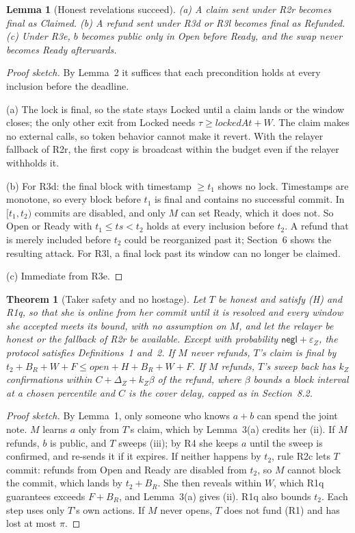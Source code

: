 \documentclass[10pt,letterpaper]{article}
\theoremstyle{plain}
\newtheorem{theorem}{Theorem}
\newtheorem{lemma}{Lemma}
\theoremstyle{definition}
\newcommand{\st}[1]{\textsf{#1}}
\begin{document}
\begin{lemma}[Honest revelations succeed]
(a) A claim sent under R2r becomes final as \st{Claimed}. (b) A refund sent under R3d or R3l
becomes final as \st{Refunded}. (c) Under R3e, $b$ becomes public only in \st{Open} before Ready,
and the swap never becomes \st{Ready} afterwards.
\end{lemma}
\begin{proof}[Proof sketch]
By Lemma~2 it suffices that each precondition holds at every inclusion before the deadline.

(a) The lock is final, so the state stays \st{Locked} until a claim lands or the window closes;
the only other exit from \st{Locked} needs $\tau \ge \mathit{lockedAt}+W$. The claim makes no
external calls, so token behavior cannot make it revert. With the relayer fallback of R2r, the
first copy is broadcast within the budget even if the relayer withholds it.

(b) For R3d: the final block with timestamp $\ge t_1$ shows no lock. Timestamps are monotone, so
every block before $t_1$ is final and contains no successful commit. In $[t_1, t_2)$ commits are
disabled, and only $M$ can set Ready, which it does not. So \st{Open} or \st{Ready} with
$t_1 \le ts < t_2$ holds at every inclusion before $t_2$. A refund that is merely included before
$t_2$ could be reorganized past it; Section~6 shows the resulting attack. For R3l, a final lock
past its window can no longer be claimed.

(c) Immediate from R3e.
\end{proof}

\begin{theorem}[Taker safety and no hostage]
Let $T$ be honest and satisfy (H) and R1q, so that she is online from her commit until it is resolved and every window she accepted meets its bound,
with no assumption on $M$, and let the relayer be honest or the fallback of R2r be available. Except with probability $\mathsf{negl}+\varepsilon_Z$, the
protocol satisfies Definitions~1 and~2. If $M$ never refunds, $T$'s claim is final by
$t_2 + B_R + W + F \le \mathit{open} + H + B_R + W + F$. If $M$ refunds, $T$'s sweep back has $k_Z$ confirmations within
$C + \Delta_Z + k_Z\beta$ of the refund, where $\beta$ bounds a block interval at a chosen
percentile and $C$ is the cover delay, capped as in Section~8.2.
\end{theorem}
\begin{proof}[Proof sketch]
By Lemma~1, only someone who knows $a+b$ can spend the joint note. $M$ learns $a$ only from $T$'s
claim, which by Lemma~3(a) credits her (ii). If $M$ refunds, $b$ is public, and $T$ sweeps (iii);
by R4 she keeps $a$ until the sweep is confirmed, and re-sends it if it expires. If neither
happens by $t_2$, rule R2c lets $T$ commit: refunds from \st{Open} and \st{Ready} are disabled
from $t_2$, so $M$ cannot block the commit, which lands by $t_2 + B_R$. She then reveals within
$W$, which R1q guarantees exceeds $F + B_R$, and Lemma~3(a) gives (ii). R1q also bounds $t_2$. Each step uses only $T$'s own actions. If $M$ never opens, $T$
does not fund (R1) and has lost at most $\pi$.
\end{proof}
\end{document}
